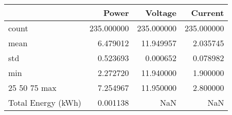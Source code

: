 \begin{tabular}{lrrr}
\toprule
 & Power & Voltage & Current \\
\midrule
count & 235.000000 & 235.000000 & 235.000000 \\
mean & 6.479012 & 11.949957 & 2.035745 \\
std & 0.523693 & 0.000652 & 0.078982 \\
min & 2.272720 & 11.940000 & 1.900000 \\
25%
50%
75%
max & 7.254967 & 11.950000 & 2.800000 \\
Total Energy (kWh) & 0.001138 & NaN & NaN \\
\bottomrule
\end{tabular}
